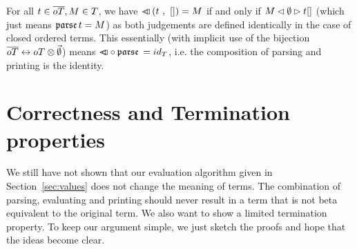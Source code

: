 \documentclass[submission,copyright,creativecommons]{eptcs}
\begin{document}
For all $t \in \overline{oT}, M \in T$, we have ${ {\lhd \hspace{-6pt} \lhd} \left( t \ , \ [] \right)} = M$ if and only if ${M \lhd \emptyset \rhd t[ ]}$ (which just means ${\mathfrak {parse } \,} t = M$) as both judgements are defined identically in the case of closed ordered terms. This essentially (with implicit use of the bijection $\overline{oT} \leftrightarrow oT \otimes \vec {\emptyset}$) means ${\lhd \hspace{-6pt} \lhd} \circ {\mathfrak {parse } \,}  = id_{T}$, i.e. the composition of parsing and printing is the identity.






\section{Correctness and Termination properties}
\label{sec:sound}



We still have not shown that our evaluation algorithm given in Section~\ref{sec:values} does not change the meaning of terms. The combination of parsing, evaluating and printing should never result in a term that is not beta equivalent to the original term. We also want to show a limited termination property.
To keep our argument simple, we just sketch the proofs and hope that the ideas become clear.
\end{document}

